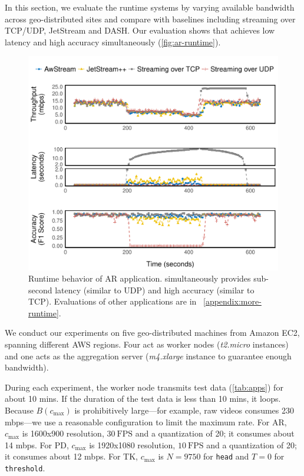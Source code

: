 In this section, we evaluate the runtime systems by varying available bandwidth
across geo-distributed sites and compare \sysname{} with baselines including
streaming over TCP/UDP, JetStream and DASH. Our evaluation shows that \sysname{}
achieves low latency and high accuracy simultaneously
(\autoref{fig:ar-runtime}).

\begin{figure}
  \centering
  \includegraphics[width=0.95\columnwidth]{figures/runtime-darknet-verticle.pdf}
  \caption{Runtime behavior of AR application. \sysname{} simultaneously
    provides sub-second latency (similar to UDP) and high accuracy (similar to
    TCP). Evaluations of other applications are in \
    \autoref{appendix:more-runtime}. }
  \label{fig:ar-runtime}
\end{figure}

 We conduct our experiments on five geo-distributed
machines from Amazon EC2, spanning different AWS regions. Four act as worker
nodes (\textit{t2.micro} instances) and one acts as the aggregation server
(\textit{m4.xlarge} instance to guarantee enough bandwidth).

During each experiment, the worker node transmits test data (\autoref{tab:apps})
for about 10 mins. If the duration of the test data is less than 10 mins, it
loops. Because $B(c_{\max})$ is prohibitively large---for example, raw videos
consumes 230 mbps---we use a reasonable configuration to limit the maximum
rate. For AR, $c_{\max}$ is 1600x900 resolution, \(30~\text{FPS}\) and a
quantization of 20; it consumes about 14 mbps. For PD, $c_{\max}$ is 1920x1080
resolution, \(10~\text{FPS}\) and a quantization of 20; it consumes about 12
mbps. For TK, $c_{\max}$ is $N=9750$ for \texttt{head} and $T=0$ for
\texttt{threshold}.

